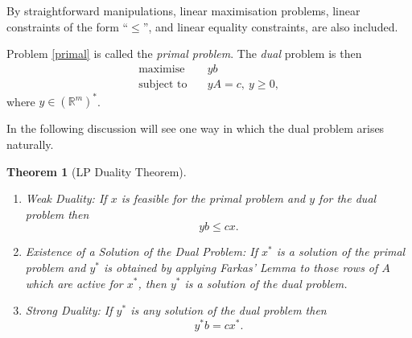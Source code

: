 \documentclass[a4paper]{amsart}
\theoremstyle{plain}
\newtheorem{theorem}{Theorem}[section]
\theoremstyle{definition}
\theoremstyle{remark}
\begin{document}
 By straightforward manipulations, linear maximisation problems, linear constraints of the form ``$ \leq $'', and linear equality constraints, are also included. 
 
Problem \ref{primal} is called the \emph{primal problem}.  The \emph{dual} problem is then 
\begin{equation} \label{dual}
\begin{aligned}
\text{maximise} \quad & yb \\
\text{subject to} \quad & yA=c,\ y \geq 0,
\end{aligned}
\end{equation} 
 where $ y \in (\mathbb{R}^m )^*$.
 
 In the following discussion will see one way in which the dual problem arises naturally.
 
 \begin{theorem}[LP Duality Theorem] \label{ThmLP} \mbox{}
 \begin{enumerate}

\item \emph{Weak Duality:}  If $ x $ is feasible for the primal problem and $ y $ for the dual problem then
 \[ yb \leq cx .\]
 \item \emph{Existence of a Solution of the Dual Problem:}  If $ x^* $ is a solution of the primal problem and $ y^* $ is obtained by applying Farkas' Lemma to those rows of $ A $ which are active for $ x^* $, then  $ y^* $ is a solution of the dual problem.
 
 \item \emph{Strong Duality:}  If $ y^* $ is \emph{any} solution of the dual problem then 
 \[   y^*b  = cx^* .\]
\end{enumerate}
\end{theorem}
\end{document}
